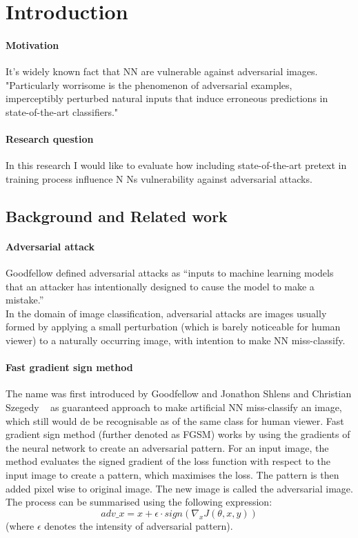 \section{Introduction}


\paragraph{Motivation}
It’s widely known fact that NN are vulnerable against adversarial images.
~\cite{ilyas2019adversarial} "Particularly worrisome is the phenomenon of adversarial examples,
imperceptibly perturbed natural inputs that induce erroneous predictions in state-of-the-art classifiers."


\paragraph{Research question}
In this research I would like to evaluate how including state-of-the-art pretext in training process influence N
Ns vulnerability against adversarial attacks.




\subsection{Background and Related work}

\paragraph{Adversarial attack}
Goodfellow defined adversarial attacks as “inputs to machine learning models that an
attacker has intentionally designed to cause the model to make a mistake.” ~\cite{DBLP:journals/corr/abs-1802-08195} \\
In the domain of image classification, adversarial attacks are images usually formed by applying a small perturbation
(which is barely noticeable for human viewer) to a naturally occurring image, with intention to make NN miss-classify.

\paragraph{Fast gradient sign method}
The name was first introduced by Goodfellow and Jonathon Shlens and Christian Szegedy
~\cite{goodfellow2015explaining} as guaranteed approach to make artificial NN miss-classify an image,
which still would de be recognisable as of the same class for human viewer.
Fast gradient sign method (further denoted as FGSM) works by using the gradients of the neural network to create an adversarial pattern.
For an input image, the method evaluates the signed gradient of the loss function with respect to the input image to create a pattern,
which maximises the loss.
The pattern is then added pixel wise to original image.
The new image is called the adversarial image.
The process can be summarised using the following expression:
\begin{equation}
    adv\_x = x + \epsilon \cdot sign(\nabla_x J(\theta, x, y))
\end{equation}
(where $\epsilon$ denotes the intensity of adversarial pattern).

